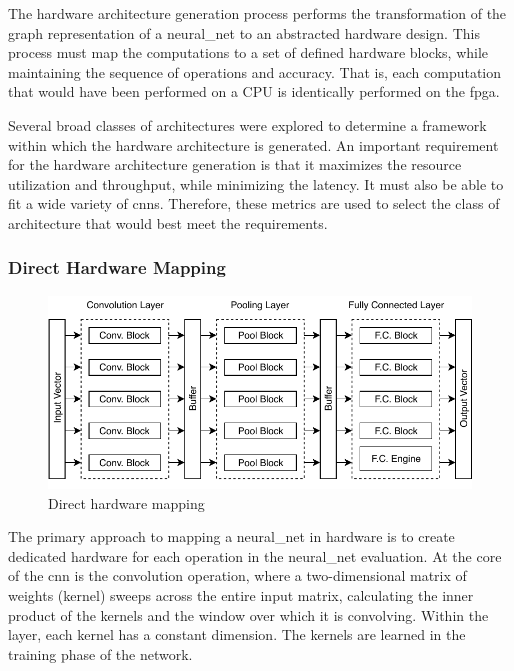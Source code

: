 \documentclass{uw-ece-wkrpt}
\begin{document}
The hardware architecture generation process performs the transformation of the graph representation of a \gls{neural_net} to an abstracted hardware design. This process must map the computations to a set of defined hardware blocks, while maintaining the sequence of operations and accuracy. That is, each computation that would have been performed on a CPU is identically performed on the \gls{fpga}.

Several broad classes of architectures were explored to determine a framework within which the hardware architecture is generated. An important requirement for the hardware architecture generation is that it maximizes the resource utilization and throughput, while minimizing the latency. It must also be able to fit a wide variety of \glspl{cnn}. Therefore, these metrics are used to select the class of architecture that would best meet the requirements.

\subsubsection{Direct Hardware Mapping}

\begin{figure}
    \centering
    \includegraphics[width=\textwidth]{figures/direct_hardware_mapping}
    \caption{Direct hardware mapping \cite{Abdelouahab2017Hardware-Automa}}\label{fig:direct_hardware_mapping}
\end{figure}

The primary approach to mapping a \gls{neural_net} in hardware is to create dedicated hardware for each operation in the \gls{neural_net} evaluation. At the core of the \gls{cnn} is the convolution operation, where a two-dimensional matrix of weights (\gls{kernel}) sweeps across the entire input matrix, calculating the inner product of the kernels and the window over which it is convolving. Within the layer, each \gls{kernel} has a constant dimension. The kernels are learned in the training phase of the network.
\end{document}
